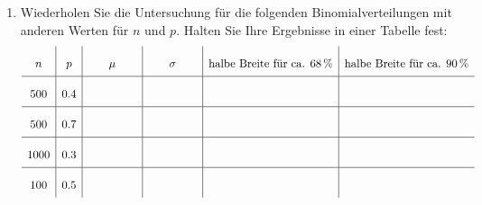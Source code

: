 \begin{LA}
\begin{enumerate}
        \item Wiederholen Sie die Untersuchung für die folgenden Binomialverteilungen mit anderen Werten für \(n\) und \(p\). Halten Sie Ihre Ergebnisse in einer Tabelle fest:
              \[
                  \renewcommand{\arraystretch}{2.2}
                  \begin{array}{c|c|c|c|c|c}
                      n    & p                                  & \mu                                & \sigma
                           & \text{halbe Breite für ca. }68\,\% & \text{halbe Breite für ca. }90\,\%
                      \\ \hline
                      500  & 0.4                                & \hspace{1.5cm}                     & \hspace{1.5cm} & \hspace{3.5cm} & \hspace{3.5cm} \\ \hline
                      500  & 0.7                                &                                    &                &                & \hspace{3.5cm} \\ \hline
                      1000 & 0.3                                &                                    &                &                & \hspace{3.5cm} \\ \hline
                      100  & 0.5                                &                                    &                &                & \hspace{3.5cm}
                  \end{array}
              \]


    \end{enumerate}

\end{LA}

